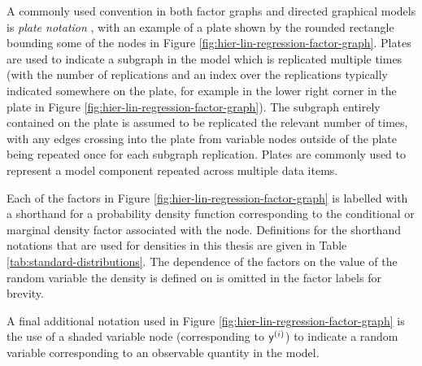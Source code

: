 A commonly used convention in both factor graphs and directed graphical models is \emph{plate notation} \citep{buntine1994operations}, with an example of a plate shown by the rounded rectangle bounding some of the nodes in Figure \ref{fig:hier-lin-regression-factor-graph}. Plates are used to indicate a subgraph in the model which is replicated multiple times (with the number of replications and an index over the replications typically indicated somewhere on the plate, for example in the lower right corner in the plate in Figure \ref{fig:hier-lin-regression-factor-graph}). The subgraph entirely contained on the plate is assumed to be replicated the relevant number of times, with any edges crossing into the plate from variable nodes outside of the plate being repeated once for each subgraph replication. Plates are commonly used to represent a model component repeated across multiple data items.

Each of the factors in Figure \ref{fig:hier-lin-regression-factor-graph} is labelled with a shorthand for a probability density function corresponding to the conditional or marginal density factor associated with the node. Definitions for the shorthand notations that are used for densities in this thesis are given in Table \ref{tab:standard-distributions}. The dependence of the factors on the value of the random variable the density is defined on is omitted in the factor labels for brevity.

A final additional notation used in Figure \ref{fig:hier-lin-regression-factor-graph} is the use of a shaded variable node (corresponding to $\mathsf{y}^{(i)}$) to indicate a random variable corresponding to an observable quantity in the model. %


